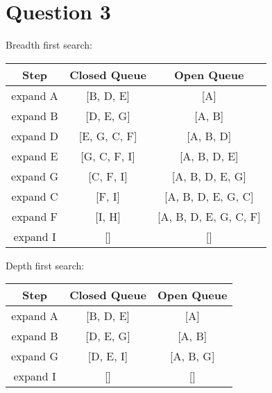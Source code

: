 \documentclass[12pt]{article}
\begin{document}

\section*{Question 3} %
\label{sec:question_3}
Breadth first search:
\begin{center}
  \begin{tabular}{|c|c|c|}
    \hline
    \textbf{Step} & \textbf{Closed Queue} & \textbf{Open Queue} \\ \hline
    expand A & [B, D, E] & [A] \\ \hline
    expand B & [D, E, G] & [A, B] \\ \hline
    expand D & [E, G, C, F] & [A, B, D] \\ \hline
    expand E & [G, C, F, I] & [A, B, D, E] \\ \hline
    expand G & [C, F, I] & [A, B, D, E, G] \\ \hline
    expand C & [F, I] & [A, B, D, E, G, C] \\ \hline
    expand F & [I, H] & [A, B, D, E, G, C, F] \\ \hline
    expand I & [] & [] \\ \hline    
  \end{tabular}
\end{center}

Depth first search:
\begin{center}
  \begin{tabular}{|c|c|c|}
    \hline
    \textbf{Step} & \textbf{Closed Queue} & \textbf{Open Queue} \\ \hline
    expand A & [B, D, E] & [A] \\ \hline
    expand B & [D, E, G] & [A, B] \\ \hline
    expand G & [D, E, I] & [A, B, G] \\ \hline
    expand I & [] & [] \\ \hline
  \end{tabular}
\end{center}
\end{document}
